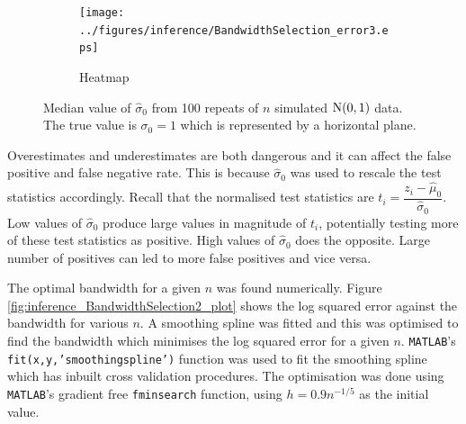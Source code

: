 \begin{figure}
  \centering
    \begin{subfigure}[b]{0.49\textwidth}
        \texttt{[image: ../figures/inference/BandwidthSelection\_error3.eps]}
        \caption{Heatmap}
    \end{subfigure}
    \caption{Median value of $\widehat{\sigma}_0$ from 100 repeats of $n$ simulated $\operatorname{N}(0,1)$ data. The true value is $\sigma_0=1$ which is represented by a horizontal plane.}
    \label{fig:inference_BandwidthSelection_error3}
\end{figure}

Overestimates and underestimates are both dangerous and it can affect the false positive and false negative rate. This is because $\widehat{\sigma}_0$ was used to rescale the test statistics accordingly. Recall that the normalised test statistics are $t_i = \dfrac{z_i - \widehat{\mu}_0}{\widehat{\sigma}_0}$. Low values of $\widehat{\sigma}_0$ produce large values in magnitude of $t_i$, potentially testing more of these test statistics as positive. High values of $\widehat{\sigma}_0$ does the opposite. Large number of positives can led to more false positives and vice versa.

The optimal bandwidth for a given $n$ was found numerically. Figure \ref{fig:inference_BandwidthSelection2_plot} shows the log squared error against the bandwidth for various $n$. A smoothing spline \citep{friedman2001elements} was fitted and this was optimised to find the bandwidth which minimises the log squared error for a given $n$. \texttt{MATLAB}'s \texttt{fit(x,y,'smoothingspline')} function was used to fit the smoothing spline which has inbuilt cross validation procedures. The optimisation was done using \texttt{MATLAB}'s gradient free \texttt{fminsearch} function, using $h=0.9n^{-1/5}$ as the initial value.

